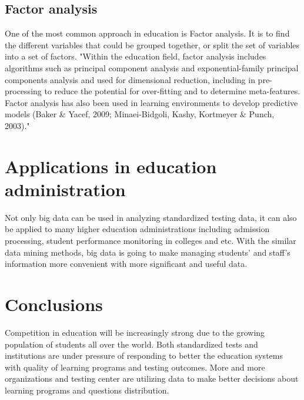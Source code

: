 \documentclass[sigconf]{acmart}
\begin{document}
\subsection{Factor analysis}
One of the most common approach in education is Factor analysis. It is to find the different variables that could be grouped together, or split the set of variables into a set of factors. \cite{Daniel2015} "Within the education field, factor analysis includes algorithms such as principal component analysis and exponential-family principal components analysis and used for dimensional reduction, including in pre-processing to reduce the potential for over-fitting and to determine meta-features. Factor analysis has also been used in learning environments to develop predictive models (Baker & Yacef, 2009; Minaei-Bidgoli, Kashy, Kortmeyer & Punch, 2003)."\cite{Daniel2015}


\section{Applications in education administration}
Not only big data can be used in analyzing standardized testing data, it can also be applied to many higher education administrations including admission processing, student performance monitoring in colleges and etc.\cite{Picciano2012} With the similar data mining methods, big data is going to make managing students' and staff's information more convenient with more significant and useful data. 

\section{Conclusions}
Competition in education will be increasingly strong due to the growing population of students all over the world.\cite{Selingo2017} Both standardized tests and institutions are under pressure of responding to better the education systems with quality of learning programs and testing outcomes. More and more organizations and testing center are utilizing data to make better decisions about learning programs and questions distribution.





 
\end{document}
